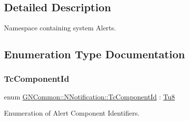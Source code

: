 \subsection{Detailed Description}
Namespace containing system Alerts. 

\subsection{Enumeration Type Documentation}
\mbox{\label{namespace_g_n_common_1_1_n_notification_ab468f440599e6d5a51d887dfa55b06b3}} 
\subsubsection{\texorpdfstring{Tc\+Component\+Id}{TcComponentId}}
{\footnotesize\ttfamily enum \mbox{\hyperlink{namespace_g_n_common_1_1_n_notification_ab468f440599e6d5a51d887dfa55b06b3}{G\+N\+Common\+::\+N\+Notification\+::\+Tc\+Component\+Id}} \+: \mbox{\hyperlink{namespace_g_n_common_a7939e251ddbf5d3a31832dcfdc8bde39}{Tu8}}\hspace{0.3cm}{\ttfamily [strong]}}



Enumeration of Alert Component Identifiers. 

